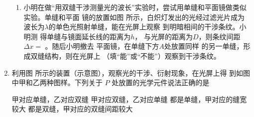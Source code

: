 \begin{enumerate}
\begin{enumerate}
\item 
小明在做“用双缝干涉测量光的波长”实验时，尝试用单缝和平面镜做类似实验。单缝和平面
镜的放置如图  所示，白炽灯发出的光经过滤光片成为波长为$ \lambda $的单色光照射单缝，能在光屏上观察
到明暗相间的干涉条纹。小明测
得单缝与镜面延长线的距离为$ h $，
与光屏的距离为$ D $，则条纹间距
$ \Delta x =$ \underlinegap 。随后小明撤去
平面镜，在单缝下方$ A $处放置同样
的另一单缝，形成双缝结构，则在光屏上 \underlinegap （填“能”或“不能”）观察到干涉条纹。
\begin{figure}[h!]
	\centering
	\ContinuedFloat
	\begin{subfigure}{0.4\linewidth}
		\centering
		
		\caption{}\label{2018浙江4月21d}
	\end{subfigure}
\end{figure}
	
\end{enumerate}






\item 
{}
利用图  所示的装置（示意图），观察光的干涉、衍射现象，在光屏上得
到如图  中甲和乙两种图样。下列关于 $ P $ 处放置的光学元件说法正确的是  
\begin{figure}[h!]
	\centering
	\begin{subfigure}{0.4\linewidth}
		\centering
		 
		\caption{}\label{2019北京光的干涉衍射a}
	\end{subfigure}
	\begin{subfigure}{0.4\linewidth}
		\centering
		 
		\caption{}\label{2019北京光的干涉衍射b}
	\end{subfigure}
\end{figure}


\fourchoices
{甲对应单缝，乙对应双缝}
{甲对应双缝，乙对应单缝}
{都是单缝，甲对应的缝宽较大}
{都是双缝，甲对应的双缝间距较大}






	
	
	
\end{enumerate}

